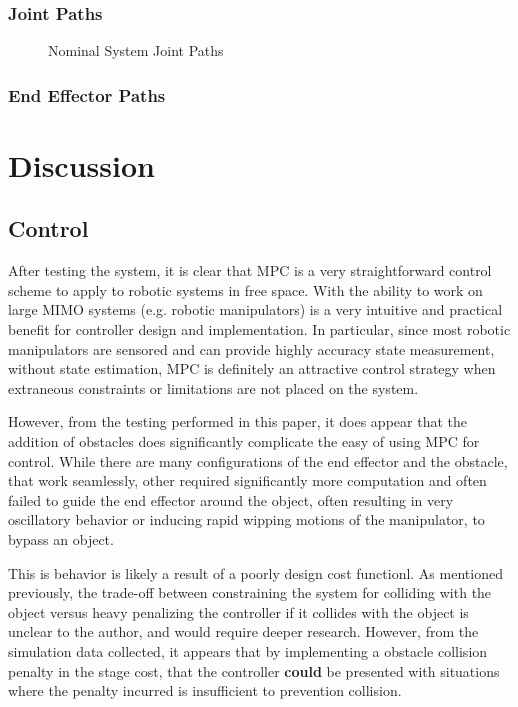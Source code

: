 \documentclass[journal]{IEEEtran}
\begin{document}
\subsubsection{Joint Paths}

\begin{figure}%
    \centering
    \qquad
    \caption{Nominal System Joint Paths}%
    \label{fig:joint_path}%
\end{figure}

\subsubsection{End Effector Paths }

\section{Discussion}

\subsection{Control}

After testing the system, it is clear that MPC is a very straightforward control scheme to apply to robotic systems in free space. With the ability to work on large MIMO systems (e.g. robotic manipulators) is a very intuitive and practical benefit for controller design and implementation. In particular, since most robotic manipulators are sensored and can provide highly accuracy state measurement, without state estimation, MPC is definitely an attractive control strategy when extraneous constraints or limitations are not placed on the system.

However, from the testing performed in this paper, it does appear that the addition of obstacles does significantly complicate the easy of using MPC for control. While there are many configurations of the end effector and the obstacle, that work seamlessly, other required significantly more computation and often failed to guide the end effector around the object, often resulting in very oscillatory behavior or inducing rapid wipping motions of the manipulator, to bypass an object.

This is behavior is likely a result of a poorly design cost functionl. As mentioned previously, the trade-off between constraining the system for colliding with the object versus heavy penalizing the controller if it collides with the object is unclear to the author, and would require deeper research. However, from the simulation data collected, it appears that by implementing a obstacle collision penalty in the stage cost, that the controller \textbf{could} be presented with situations where the penalty incurred is insufficient to prevention collision.
\end{document}
